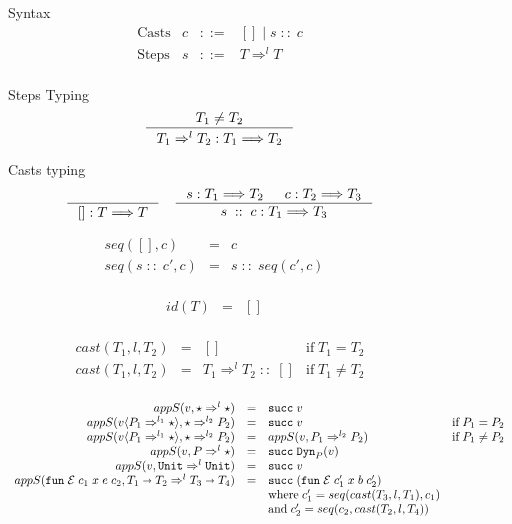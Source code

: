 \documentclass[acmsmall,review,anonymous]{acmart}\settopmatter{printfolios=true,printccs=false,printacmref=false}
\newcommand{\stxrule}[3]{\text{#2} & #1 & ::= & #3\\}
\newcommand{\funrule}[3]{#1 &=& #2 & #3\\}
\newcommand{\judgeTypeFT}[3]{#1 : #2 \Longrightarrow #3} %
\newcommand{\POOunit}[0]{\mathtt{Unit}}
\newcommand{\POOfun}[2]{#1 \shortrightarrow #2}
\newcommand{\cOOcast}[3]{#1 \Rightarrow^{#2} #3}
\newcommand{\vOOcast}[2]{#1\langle#2\rangle}
\newcommand{\rOOsucc}[1]{\mathtt{succ}\;#1}
\newcommand{\hcvOOinj}[2]{\mathtt{Dyn}_{#1}(#2)}
\newcommand{\hcvOOfun}[5]{\mathtt{fun} \; #2 \; #1 \; #3 \; #4 \; #5}
\newcommand{\sidecond}[1]{\text{if}\;#1}
\newcommand{\lsOOcast}[3]{\cOOcast{#1}{#2}{#3}}
\newcommand{\lcOOnull}[0]{[]}
\newcommand{\lcOOcons}[2]{#1 \; :: \; #2}
\begin{document}
\begin{figure}
Syntax
\[
\begin{array}{lrcl}
\stxrule{c}{Casts}{\lcOOnull{} \mid \lcOOcons{s}{c}}
\stxrule{s}{Steps}{\lsOOcast{T}{l}{T}}
\end{array}
\]

Steps Typing
\fbox{$\judgeTypeFT{s}{T}{T}$}
\begin{gather*}
\inference{
  T_1 \neq T_2
}{
  \judgeTypeFT{\lsOOcast{T_1}{l}{T_2}}{T_1}{T_2}
}
\end{gather*}

Casts typing
\fbox{$\judgeTypeFT{c}{T}{T}$}
\begin{gather*}
\inference{
}{
  \judgeTypeFT{\lcOOnull}{T}{T}
}
\quad
\inference{
  \judgeTypeFT{s}{T_1}{T_2} &
  \judgeTypeFT{c}{T_2}{T_3}
}{
  \judgeTypeFT{\lcOOcons{s}{c}}{T_1}{T_3}
}
\end{gather*}

\[
\begin{array}{rclr}
\funrule{seq(\lcOOnull,c)}{c}{}
\funrule{seq(\lcOOcons{s}{c'},c)}{\lcOOcons{s}{seq(c',c)}}{}
\end{array}
\]

\[
\begin{array}{rclr}
\funrule{id(T)}{\lcOOnull}{}
\end{array}
\]

\[
\begin{array}{rclc}
\funrule{cast(T_1,l,T_2)}{
  \lcOOnull
}{
  \sidecond{T_1 = T_2}
}
\funrule{cast(T_1,l,T_2)}{
  \lcOOcons{\lsOOcast{T_1}{l}{T_2}}{\lcOOnull}
}{
  \sidecond{T_1 \neq T_2}
}
\end{array}
\]

  
\[
\begin{array}{rclr}
\funrule{
  appS(v,\cOOcast{\star}{l}{\star})
}{
  \rOOsucc{v}
}{}
\funrule{
  appS(\vOOcast{v}{\cOOcast{P_1}{l_1}{\star}},\cOOcast{\star}{l_2}{P_2})
}{
  \rOOsucc{v}
}{\sidecond{P_1 = P_2}}
\funrule{
appS(\vOOcast{v}{\cOOcast{P_1}{l_1}{\star}},\cOOcast{\star}{l_2}{P_2})
}{
appS(v,\cOOcast{P_1}{l_2}{P_2})
}{\sidecond{P_1 \neq P_2}}
\funrule{
  appS(v,\cOOcast{P}{l}{\star})
}{
  \rOOsucc{\hcvOOinj{P}{v}}
}{}
\funrule{
  appS(v,\lsOOcast{\POOunit}{l}{\POOunit})
}{
  \rOOsucc{v}
}{}
\funrule{
  appS(
    \hcvOOfun{c_1}{\mathcal{E}}{x}{e}{c_2},
    \lsOOcast{\POOfun{T_1}{T_2}}{l}{\POOfun{T_3}{T_4}})
}{
  \rOOsucc{(\hcvOOfun{c_1'}{\mathcal{E}}{x}{b}{c_2'})}
}{
  \\ &&
  \text{where} \;
  c_1' = seq(cast(T_3,l,T_1),c_1)
  \\ &&
  \text{and} \;
  c_2' = seq(c_2,cast(T_2,l,T_4))
}


\end{array}\]
\end{figure}
\end{document}
